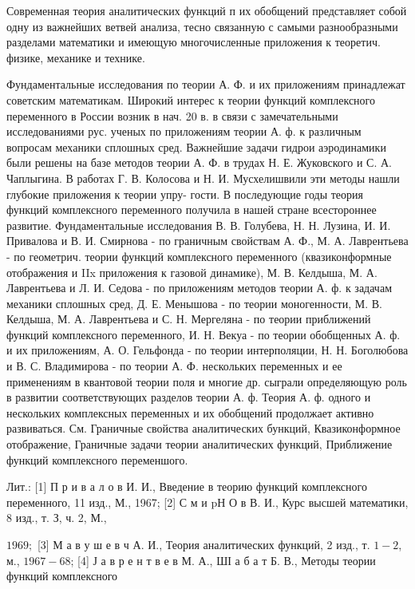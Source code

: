 \documentclass[10pt]{article}
\begin{document}
Современная теория аналитических функций п их обобщений представляет собой одну из важнейших ветвей анализа, тесно связанную с самыми разнообразными разделами математики и имеющую многочисленные приложения к теоретич. физике, механике и технике.



Фундаментальные исследования по теории А. Ф. и их приложениям принадлежат советским математикам. Широкий интерес к теории функций комплексного переменного в России возник в нач. 20 в. в связи с замечательными исследованиями рус. ученых по приложениям теории А. ф. к различным вопросам механики сплошных сред. Важнейшие задачи гидрои аэродинамики были решены на базе методов теории А. Ф. в трудах Н. Е. Жуковского и С. А. Чаплыгина. В работах Г. В. Колосова и Н. И. Мусхелишвили эти методы нашли глубокие приложения к теории упру- гости. В последующие годы теория функций комплексного переменного получила в нашей стране всестороннее развитие. Фундаментальные исследования В. В. Голубева, Н. Н. Лузина, И. И. Привалова и В. И. Смирнова - по граничным свойствам А. Ф., М. А. Лаврентьева - по геометрич. теории функций комплексного переменного (квазиконформные отображения и IIx приложения к газовой динамике), М. В. Келдыша, М. А. Лаврентьева и Л. И. Седова - по приложениям методов теории А. ф. к задачам механики сплошных сред, Д. Е. Менышова - по теории моногенности, М. В. Келдыша, М. А. Лаврентьева и С. Н. Мергеляна - по теории приближений функций комплексного переменного, И. Н. Векуа - по теории обобщенных А. ф. и их приложениям, А. О. Гельфонда - по теории интерполяции, Н. Н. Боголюбова и В. С. Владимирова - по теории А. Ф. нескольких переменных и ее применениям в квантовой теории поля и многие др. сыграли определяющую роль в развитии соответствующих разделов теории А. ф. Теория А. ф. одного и нескольких комплексных переменных и их обобщений продолжает активно развиваться. См. Граничные свойства аналитических бункций, Квазиконформное отображение, Граничные задачи теории аналитических функций, Приближение функций комплексного переменшого.



Лит.: [1] П р и в а л о в И. И., Введение в теорию функций комплексного переменного, 11 изд., М., 1967; [2] С м и pН О в В. И., Курс высшей математики, 8 изд., т. З, ч. 2, М.,

$1969 ;$ [3] М а в у ш е в ч А. И., Теория аналитических функций, 2 изд., т. $1-2$, м., $1967-68$; [4] Ј а в р е н т в е в М. А., ШІ а б а т Б. В., Методы теории функций комплексного
\end{document}
